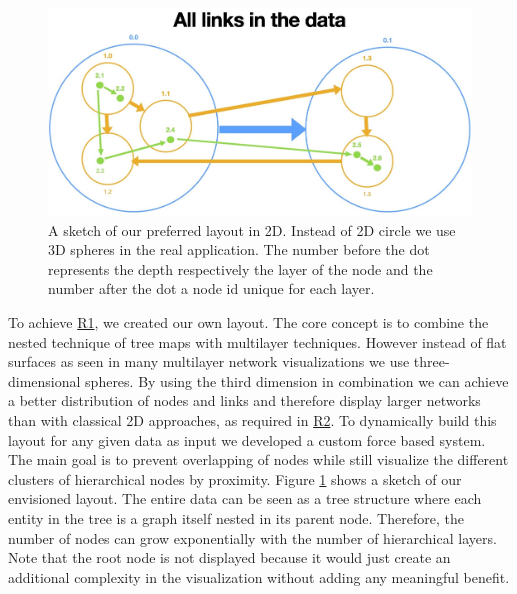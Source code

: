 \begin{figure}[h]
    \centering
    \includegraphics[width=\textwidth, trim={0cm 0cm 0cm 3.5cm},clip]{graphics/filterLinks/allLinks.jpg}
    \caption[A sketch of our preferred layout in 2D.]{A sketch of our preferred layout in 2D. Instead of 2D circle we use 3D spheres in the real application. The number before the dot represents the depth respectively the layer of the node and the number after the dot a node id unique for each layer.} 
    \label{fig:layoutSketch} 
\end{figure}
To achieve \hyperref[req:R1]{R1}, we created our own layout. The core concept is to combine the nested technique of tree maps with multilayer techniques. However instead of flat surfaces as seen in many multilayer network visualizations we use three-dimensional spheres. 
By using the third dimension in combination we can achieve a better distribution of nodes and links and therefore display larger networks than with classical 2D approaches, as required in \hyperref[req:R2]{R2}. 
To dynamically build this layout for any given data as input we developed a custom force based system.
The main goal is to prevent overlapping of nodes while still visualize the different clusters of hierarchical nodes by proximity. Figure \ref{fig:layoutSketch} shows a sketch of our envisioned layout. The entire data can be seen as a tree structure where each entity in the tree is a graph itself nested in its parent node. Therefore, the number of nodes can grow exponentially with the number of hierarchical layers. Note that the root node is not displayed because it would just create an additional complexity in the visualization without adding any meaningful benefit.

